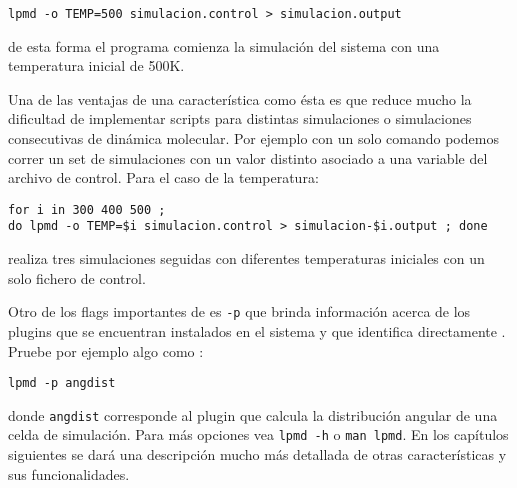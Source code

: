 \begin{center}
 \texttt{lpmd -o TEMP=500 simulacion.control > simulacion.output}
\end{center}

de esta forma el programa comienza la simulaci\'on del sistema con una temperatura inicial de 500K. 

Una de las ventajas de una caracter\'istica como \'esta es que reduce mucho la dificultad de implementar scripts para distintas simulaciones o simulaciones consecutivas de din\'amica molecular. Por ejemplo con un solo comando podemos correr un set de simulaciones con un valor distinto asociado a una variable del archivo de control. Para el caso de la temperatura:

\begin{center}
 \texttt{for i in 300 400 500 ; \\do lpmd -o TEMP=\$i simulacion.control > simulacion-\$i.output ; done}
\end{center}

realiza tres simulaciones seguidas con diferentes temperaturas iniciales con un solo fichero de control.


Otro de los flags importantes de \lpmd es \verb|-p| que brinda informaci\'on acerca de los plugins que se encuentran instalados en el sistema y que identifica directamente \lpmd. Pruebe por ejemplo algo como :

\begin{center}
 \texttt{lpmd -p angdist}
\end{center}

donde \verb|angdist| corresponde al plugin que calcula la distribuci\'on angular de una celda de simulaci\'on. Para m\'as opciones vea \verb|lpmd -h| o \verb|man lpmd|. En los cap\'itulos siguientes se dar\'a una descripci\'on mucho m\'as detallada de otras caracter\'isticas \lpmd y sus funcionalidades.
